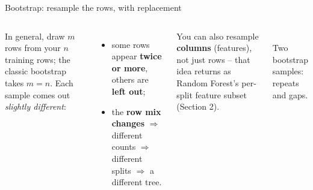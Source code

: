 \documentclass[aspectratio=169]{beamer}
\begin{document}
\begin{frame}{Bootstrap: resample the rows, with replacement}
  \begin{columns}[T]
    \vskip 5pt
    In general, draw $m$ rows from your $n$ training rows; the classic bootstrap takes
    $m = n$. Each sample comes out \emph{slightly different}:
    \begin{itemize}\small
      \item some rows appear \textbf{twice or more}, others are \textbf{left out};
      \item the \textbf{row mix changes} $\Rightarrow$ different counts $\Rightarrow$
        different splits $\Rightarrow$ a different tree.
    \end{itemize}
    \vskip 2pt
    \footnotesize You can also resample \textbf{columns} (features), not just rows -- that
    idea returns as Random Forest's per-split feature subset (Section 2).
    \begin{center}
      \\[-1pt]
      \scriptsize Two bootstrap samples: repeats and gaps.
    \end{center}
  \end{columns}
\end{frame}
\end{document}
